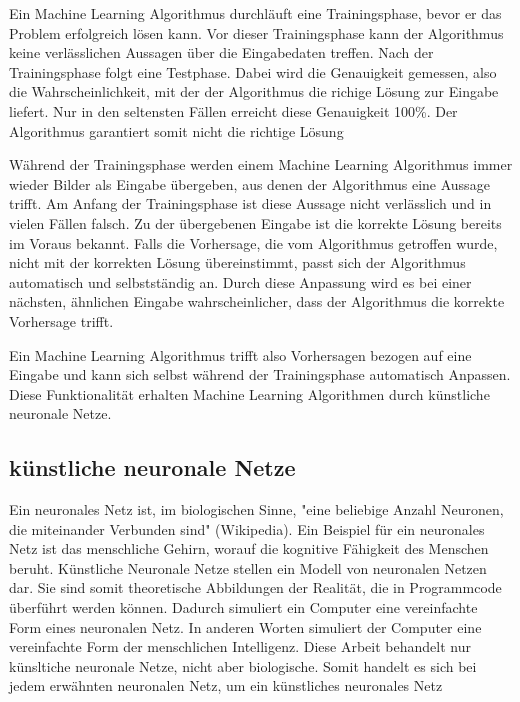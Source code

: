 Ein Machine Learning Algorithmus durchläuft eine Trainingsphase, bevor er das
Problem erfolgreich lösen kann. Vor dieser Trainingsphase kann der Algorithmus
keine verlässlichen Aussagen über die Eingabedaten treffen. Nach der
Trainingsphase folgt eine Testphase. Dabei wird die Genauigkeit gemessen, also
die Wahrscheinlichkeit, mit der der Algorithmus die richige Lösung zur Eingabe
liefert. Nur in den seltensten Fällen erreicht diese Genauigkeit 100\%. Der
Algorithmus garantiert somit nicht die richtige Lösung

Während der Trainingsphase werden einem Machine Learning Algorithmus immer
wieder Bilder als Eingabe übergeben, aus denen der Algorithmus eine Aussage
trifft. Am Anfang der Trainingsphase ist diese Aussage nicht verlässlich und in
vielen Fällen falsch. Zu der übergebenen Eingabe ist die korrekte Lösung bereits
im Voraus bekannt. Falls die Vorhersage, die vom Algorithmus getroffen wurde,
nicht mit der korrekten Lösung übereinstimmt, passt sich der Algorithmus
automatisch und selbstständig an. Durch diese Anpassung wird es bei einer
nächsten, ähnlichen Eingabe wahrscheinlicher, dass der Algorithmus die korrekte
Vorhersage trifft. 

Ein Machine Learning Algorithmus trifft also Vorhersagen bezogen auf eine
Eingabe und kann sich selbst während der Trainingsphase automatisch Anpassen.
Diese Funktionalität erhalten Machine Learning Algorithmen durch künstliche
neuronale Netze.

\subsection*{künstliche neuronale Netze}

Ein neuronales Netz ist, im biologischen Sinne, "eine beliebige Anzahl Neuronen,
die miteinander Verbunden sind" (Wikipedia). Ein Beispiel für ein neuronales
Netz ist das menschliche Gehirn, worauf die kognitive Fähigkeit des Menschen
beruht. Künstliche Neuronale Netze stellen ein Modell von neuronalen Netzen dar.
Sie sind somit theoretische Abbildungen der Realität, die in Programmcode
überführt werden können. Dadurch simuliert ein Computer eine vereinfachte Form
eines neuronalen Netz. In anderen Worten simuliert der Computer eine
vereinfachte Form der menschlichen Intelligenz. Diese Arbeit behandelt nur
künsltiche neuronale Netze, nicht aber biologische. Somit handelt es sich bei
jedem erwähnten neuronalen Netz, um ein künstliches neuronales Netz 

